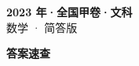 \documentclass[zihao=-4, a4paper]{ctexart}
\begin{document}
\begin{center}
  {\Large\bfseries 2023 年·全国甲卷·文科}\\[4pt]
  {\large 数学 · 简答版}
\end{center}
\medskip
{}

\clearpage
{}
\begin{center}{\Large\bfseries 答案速查}\end{center}
\medskip

\end{document}

